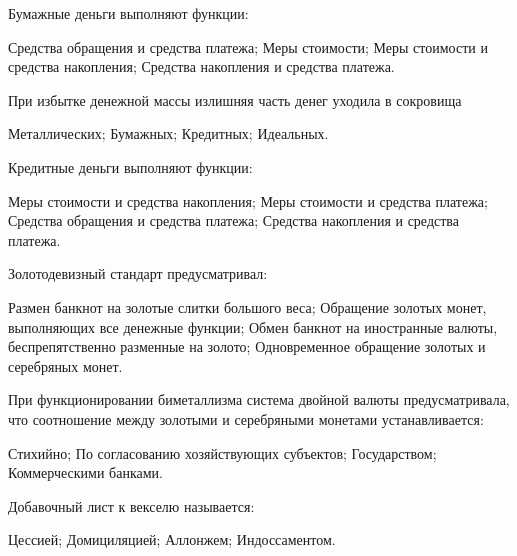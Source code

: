 \documentclass[12pt, table]{exam}
\begin{document}
\begin{questions}
\begin{multicols}{2}
\question Бумажные деньги выполняют функции:
	 \begin{choices}
	 \CC Средства обращения и средства платежа;
	 \choice Меры стоимости;
	 \choice Меры стоимости и средства накопления;
	 \choice Средства накопления и средства платежа.
	 \end{choices}
\question При избытке денежной массы излишняя часть  денег уходила в сокровища
	 \begin{choices}
	 \CC Металлических;
	 \choice Бумажных;
	 \choice Кредитных;
	 \choice Идеальных.
	 \end{choices}
\question Кредитные деньги выполняют функции:
	 \begin{choices}
	 \choice Меры стоимости и средства накопления;
	 \choice Меры стоимости и средства платежа;
	 \CC Средства обращения и средства платежа;
	 \choice Средства накопления и средства платежа.
	 \end{choices}
\question Золотодевизный стандарт предусматривал:
	 \begin{choices}
	 \choice Размен банкнот на золотые слитки большого веса;
	 \choice Обращение золотых монет, выполняющих все денежные функции;
	 \CC Обмен банкнот на иностранные валюты, беспрепятственно разменные на золото;
	 \choice Одновременное обращение золотых и серебряных монет.
	 \end{choices}
\question При функционировании биметаллизма система двойной валюты предусматривала, что соотношение между золотыми и серебряными монетами устанавливается:
	 \begin{choices}
	 \choice Стихийно;
	 \choice По согласованию хозяйствующих субъектов;
	 \CC Государством;
	 \choice Коммерческими банками.
	 \end{choices}
\question Добавочный лист к векселю называется:
	 \begin{choices}
	 \choice Цессией;
	 \choice Домициляцией;
	 \CC Аллонжем;
	 \choice Индоссаментом.
	 \end{choices}



\end{multicols}
\end{questions}
\end{document}
